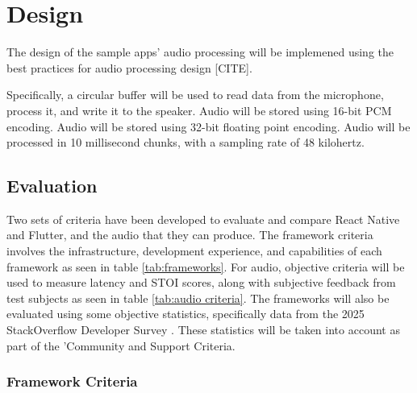 \newpage
\section{Design} \label{design}

The design of the sample apps' audio processing will be implemened using the best practices for audio processing design [CITE].

Specifically, a circular buffer will be used to read data from the microphone, process it, and write it to the speaker. Audio will be stored using 16-bit PCM encoding. Audio will be stored using 32-bit floating point encoding. Audio will be processed in 10 millisecond chunks, with a sampling rate of 48 kilohertz. 

\subsection{Evaluation}

Two sets of criteria have been developed to evaluate and compare React Native and Flutter, and the audio that they can produce.
The framework criteria involves the infrastructure, development experience, and capabilities of each framework as seen in table \ref{tab:frameworks}.
For audio, objective criteria will be used to measure latency and STOI scores, along with subjective feedback from test subjects as seen in table \ref{tab:audio criteria}.
The frameworks will also be evaluated using some objective statistics, specifically data from the 2025 StackOverflow Developer Survey \cite{stackoverflow_technology}.
These statistics will be taken into account as part of the 'Community and Support Criteria.

\subsubsection{Framework Criteria}

